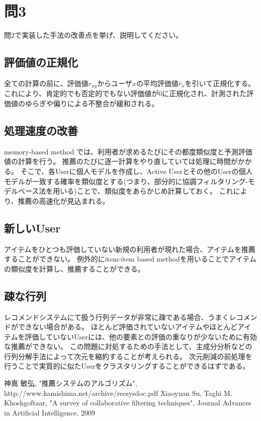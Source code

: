\documentclass[11pt,a4j]{jsarticle}
\begin{document}
\newpage

  \section*{問3}
  問2で実装した手法の改善点を挙げ、説明してください。
    \subsection*{評価値の正規化}
    全ての計算の前に、評価値$r_{xy}$からユーザ$x$の平均評価値$\bar{r}_x$を引いて正規化する。
    これにより、肯定的でも否定的でもない評価値が0に正規化され、計測された評価値のゆらぎや偏りによる不整合が緩和される。

    \subsection*{処理速度の改善}
    memory-based method では、利用者が求めるたびにその都度類似度と予測評価値の計算を行う。
    推薦のたびに逐一計算をやり直していては処理に時間がかかる。
    そこで、各Userに個人モデルを作成し、Active Userとその他のUserの個人モデルが一致する確率を類似度とする(つまり、部分的に協調フィルタリング-モデルベース法を用いる)ことで、類似度をあらかじめ計算しておく。
    これにより、推薦の高速化が見込まれる。

    \subsection*{新しいUser}
    アイテムをひとつも評価していない新規の利用者が現れた場合、アイテムを推薦することができない。
    例外的にitem-item based methodを用いることでアイテムの類似度を計算し、推薦することができる。

    \subsection*{疎な行列}
    レコメンドシステムにて扱う行列データが非常に疎である場合、うまくレコメンドができない場合がある。
    ほとんど評価されていないアイテムやほとんどアイテムを評価していないUserには、他の要素との評価の重なりが少ないために有効な推薦ができない。
    この問題に対処するための手法として、主成分分析などの行列分解手法によって次元を縮約することが考えられる。
    次元削減の前処理を行うことで実質的に似たUserをクラスタリングすることができるはずである。

\newpage

\begin{thebibliography}{12}
  神嶌 敏弘, "推薦システムのアルゴリズム", \\
  http://www.kamishima.net/archive/recsysdoc.pdf
  Xiaoyuan Su, Taghi M. Khoshgoftaar, "A survey of collaborative filtering techniques", Journal Advances in Artificial Intelligence, 2009
\end{thebibliography}
\end{document}
